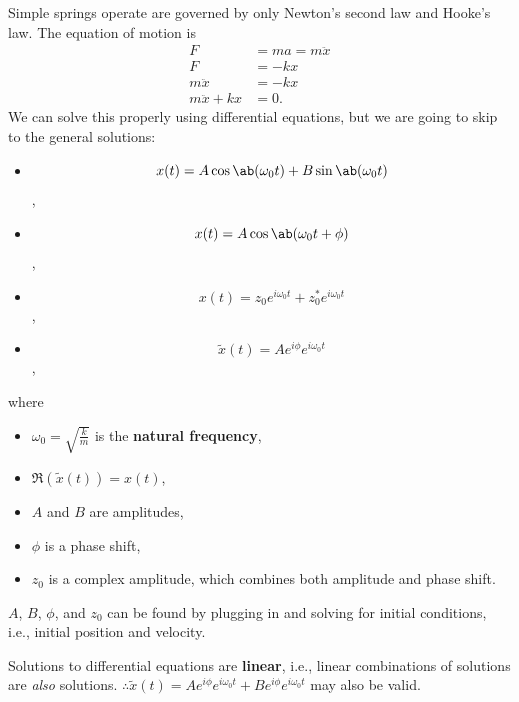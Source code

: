 Simple springs operate are governed by only Newton's second law and Hooke's law.
The equation of motion is
\begin{equation}
    \begin{aligned}
        F              &= m a = m \ddot{x} \\
        F              &= - k x \\
        m \ddot{x}      &= - k x \\
        m \ddot{x} + k x &= 0.
    \end{aligned}
\end{equation}
We can solve this properly using differential equations,
but we are going to skip to the general solutions:
\begin{itemize}
    \item
        \begin{equation}
            x(t) = A \cos\ab(\omega_0 t) + B\sin\ab(\omega_0 t)
        \end{equation},
    \item
        \begin{equation}
            x(t) = A \cos\ab(\omega_0 t + \phi)
        \end{equation},
    \item
        \begin{equation}
            x(t) = z_0 e^{i \omega_0 t} + z^*_0 e^{i \omega_0 t}
        \end{equation},
    \item
        \begin{equation}
            \tilde{x}(t) = A e^{i \phi} e^{i \omega_0 t}
        \end{equation},
\end{itemize}
where
\begin{itemize}
    \item \(\omega_0 = \sqrt{\frac{k}{m}}\) is the \textbf{natural frequency},
    \item \(\Re(\tilde{x}(t)) = x(t)\),
    \item \(A\) and \(B\) are amplitudes,
    \item \(\phi\) is a phase shift,
    \item \(z_0\) is a complex amplitude, which combines both
        amplitude and phase shift.
\end{itemize}
\(A\), \(B\), \(\phi\), and \(z_0\)
can be found by plugging in and solving for initial conditions,
i.e., initial position and velocity.

Solutions to differential equations are \textbf{linear},
i.e., linear combinations of solutions are \emph{also} solutions.
\(\therefore \tilde{x}(t) = A e^{i \phi} e^{i \omega_0 t} + B e^{i
\phi} e^{i \omega_0 t}\)
may also be valid.

